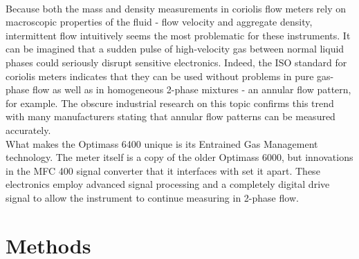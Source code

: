 \documentclass{report}
\begin{document}
\\
Because both the mass and density measurements in coriolis flow meters rely on macroscopic properties of the fluid - flow velocity and aggregate density, intermittent flow intuitively seems the most problematic for these instruments. It can be imagined that a sudden pulse of high-velocity gas between normal liquid phases could seriously disrupt sensitive electronics. Indeed, the ISO standard for coriolis meters indicates that they can be used without problems in pure gas-phase flow as well as in homogeneous 2-phase mixtures - an annular flow pattern, for example. \cite{ISO} The obscure industrial research on this topic confirms this trend with many manufacturers stating that annular flow patterns can be measured accurately. \cite{emerson2Phase}\\
What makes the Optimass 6400 unique is its Entrained Gas Management technology. The meter itself is a copy of the older Optimass 6000, but innovations in the MFC 400 signal converter that it interfaces with set it apart. These electronics employ advanced signal processing and a completely digital drive signal to allow the instrument to continue measuring in 2-phase flow. \cite{krohne brochure}\cite{processArticle}\\

\chapter{Methods} 
\label{methods}
\end{document}
